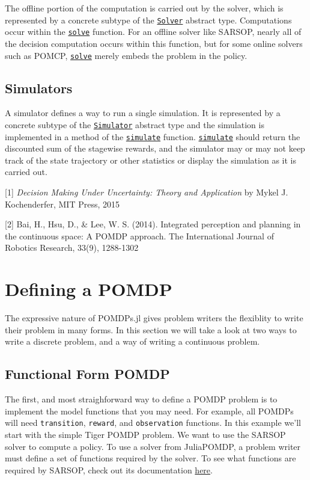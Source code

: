 \documentclass[12pt,]{article}
\begin{document}
The offline portion of the computation is carried out by the solver,
which is represented by a concrete subtype of the
\href{api.md\#POMDPs.Solver}{\texttt{Solver}} abstract type.
Computations occur within the
\href{api.md\#POMDPs.solve}{\texttt{solve}} function. For an offline
solver like SARSOP, nearly all of the decision computation occurs within
this function, but for some online solvers such as POMCP,
\href{api.md\#POMDPs.solve}{\texttt{solve}} merely embeds the problem in
the policy.

\subsection{Simulators}\label{simulators}

A simulator defines a way to run a single simulation. It is represented
by a concrete subtype of the
\href{api.md\#POMDPs.Simulator}{\texttt{Simulator}} abstract type and
the simulation is implemented in a method of the
\href{api.md\#POMDPs.simulate}{\texttt{simulate}} function.
\href{api.md\#POMDPs.simulate}{\texttt{simulate}} should return the
discounted sum of the stagewise rewards, and the simulator may or may
not keep track of the state trajectory or other statistics or display
the simulation as it is carried out.

{[}1{]} \emph{Decision Making Under Uncertainty: Theory and Application}
by Mykel J. Kochenderfer, MIT Press, 2015

{[}2{]} Bai, H., Hsu, D., \& Lee, W. S. (2014). Integrated perception
and planning in the continuous space: A POMDP approach. The
International Journal of Robotics Research, 33(9), 1288-1302

\section{Defining a POMDP}\label{defining-a-pomdp}

The expressive nature of POMDPs.jl gives problem writers the flexiblity
to write their problem in many forms. In this section we will take a
look at two ways to write a discrete problem, and a way of writing a
continuous problem.

\subsection{Functional Form POMDP}\label{functional-form-pomdp}

The first, and most straighforward way to define a POMDP problem is to
implement the model functions that you may need. For example, all POMDPs
will need \texttt{transition}, \texttt{reward}, and \texttt{observation}
functions. In this example we'll start with the simple Tiger POMDP
problem. We want to use the SARSOP solver to compute a policy. To use a
solver from JuliaPOMDP, a problem writer must define a set of functions
required by the solver. To see what functions are required by SARSOP,
check out its documentation \protect\hyperlink{href}{here}.
\end{document}
